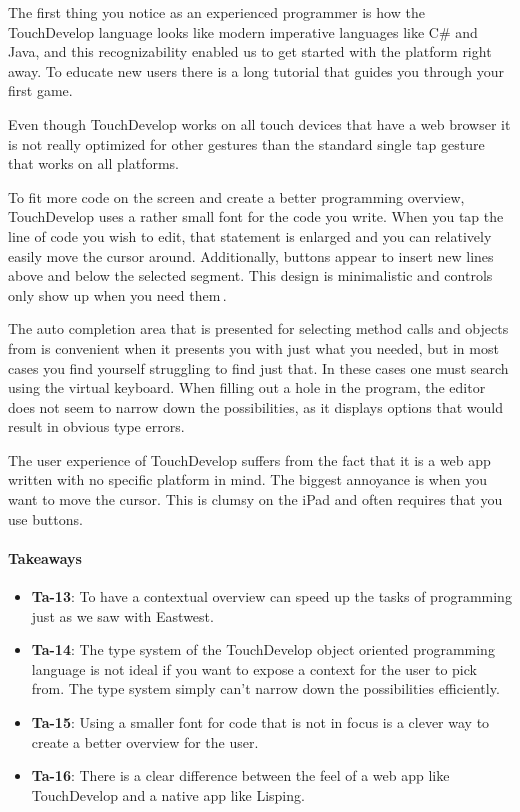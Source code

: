 The first thing you notice as an experienced programmer is how the TouchDevelop language looks like modern imperative languages like C\# and Java, and this recognizability enabled us to get started with the platform right away. 
To educate new users there is a long tutorial that guides you through your first game. 

Even though TouchDevelop works on all touch devices that have a web browser it is not really optimized for other gestures than the standard single tap gesture that works on all platforms.

To fit more code on the screen and create a better programming overview, TouchDevelop uses a rather small font for the code you write. 
When you tap the line of code you wish to edit, that statement is enlarged and you can relatively easily move the cursor around. 
Additionally, buttons appear to insert new lines above and below the selected segment. 
This design is minimalistic and controls only show up when you need them\,\cite{nielsen1990heuristic}.

The auto completion area that is presented for selecting method calls and objects from is convenient when it presents you with just what you needed, but in most cases you find yourself struggling to find just that.
In these cases one must search using the virtual keyboard.
When filling out a hole in the program, the editor does not seem to narrow down the possibilities, as it displays options that would result in obvious type errors.

The user experience of TouchDevelop suffers from the fact that it is a web app written with no specific platform in mind. The biggest annoyance is when you want to move the cursor. This is clumsy on the iPad and often requires that you use buttons.

\paragraph{Takeaways}
\begin{itemize}
	\item \textbf{Ta-13}: To have a contextual overview can speed up the tasks of programming just as we saw with Eastwest.
	\item \textbf{Ta-14}: The type system of the TouchDevelop object oriented programming language is not ideal if you want to expose a context for the user to pick from. The type system simply can't narrow down the possibilities efficiently.
	\item \textbf{Ta-15}: Using a smaller font for code that is not in focus is a clever way to create a better overview for the user.
	\item \textbf{Ta-16}: There is a clear difference between the feel of a web app like TouchDevelop and a native app like Lisping.
\end{itemize}

